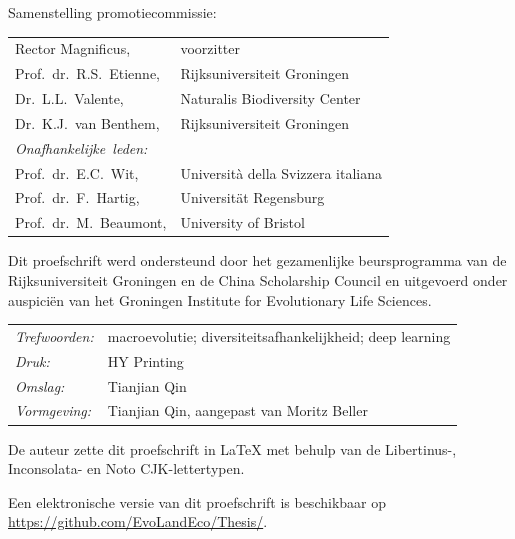 \begin{titlepage}
\bigskip
\noindent Samenstelling promotiecommissie:

\begin{tabular}{p{4.5cm}l}
    Rector Magnificus, & voorzitter \\
    Prof.\ dr.\ R.S.\ Etienne, & Rijksuniversiteit Groningen \\
    Dr.\ L.L.\ Valente, & Naturalis Biodiversity Center \\
    Dr.\ K.J.\ van Benthem, & Rijksuniversiteit Groningen \\

    \medskip
    \mbox{\emph{Onafhankelijke leden:}} & \\
    Prof.\ dr.\ E.C.\ Wit, & Università della Svizzera italiana \\
    Prof.\ dr.\ F.\ Hartig, & Universität Regensburg \\
    Prof.\ dr.\ M.\ Beaumont, & University of Bristol \\
\end{tabular}

\medskip\medskip
\noindent Dit proefschrift werd ondersteund door het gezamenlijke beursprogramma van de Rijksuniversiteit Groningen en de China Scholarship Council en uitgevoerd onder auspiciën van het Groningen Institute for Evolutionary Life Sciences.

\medskip
\noindent
\begin{tabular}{@{}p{}@{}p{}}
  \textit{Trefwoorden:} & macroevolutie; diversiteitsafhankelijkheid; deep learning \\[\medskipamount]
  \textit{Druk:} & HY Printing \\[\medskipamount]
  \textit{Omslag:} & Tianjian Qin \\[\medskipamount]
  \textit{Vormgeving:} & Tianjian Qin, aangepast van Moritz Beller \\[\medskipamount]
\end{tabular}

\medskip\medskip
\noindent De auteur zette dit proefschrift in \LaTeX\xspace met behulp van de Libertinus-, Inconsolata- en Noto CJK-lettertypen.

\vspace{\bigskipamount}

\medskip
\noindent Een elektronische versie van dit proefschrift is beschikbaar op \\
\url{https://github.com/EvoLandEco/Thesis/}.

\end{titlepage}

